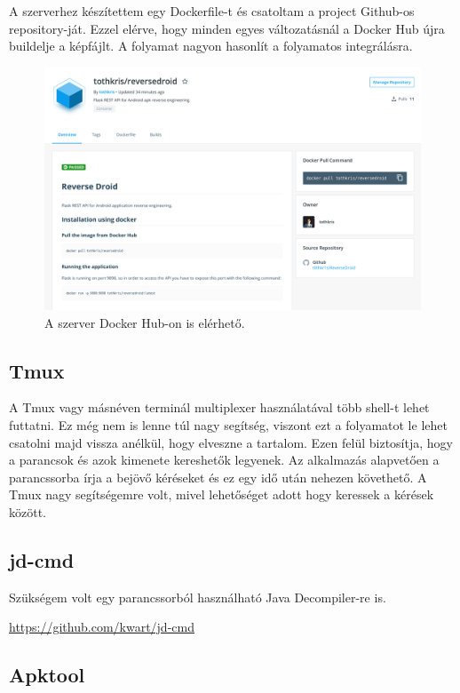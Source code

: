 \documentclass{thesis-ekf}
\theoremstyle{definition}
\theoremstyle{remark}
\begin{document}
A szerverhez készítettem egy Dockerfile-t és csatoltam a project Github-os repository-ját.
Ezzel elérve, hogy minden egyes változatásnál a Docker Hub újra buildelje a képfájlt.
A folyamat nagyon hasonlít a folyamatos integrálásra.

\begin{figure}[!h]
	\centering
	\includegraphics[width=15cm]{kepek/docker_hub}
	\caption{A szerver Docker Hub-on is elérhető.}
	\label{dockerhub}
\end{figure}

\subsection*{Tmux}

A Tmux vagy másnéven terminál multiplexer használatával több shell-t lehet futtatni.
Ez még nem is lenne túl nagy segítség, viszont ezt a folyamatot le lehet csatolni majd vissza anélkül, hogy elveszne a tartalom.
Ezen felül biztosítja, hogy a parancsok és azok kimenete kereshetők legyenek.
Az alkalmazás alapvetően a parancssorba írja a bejövő kéréseket és ez egy idő után nehezen követhető.
A Tmux nagy segítségemre volt, mivel lehetőséget adott hogy keressek a kérések között.

\subsection{jd-cmd}

Szükségem volt egy parancssorból használható Java Decompiler-re is. 

\url{https://github.com/kwart/jd-cmd}

\subsection{Apktool}
\end{document}
